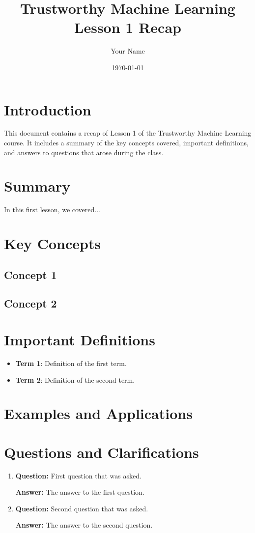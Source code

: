\documentclass[11pt,a4paper]{article}
\title{Trustworthy Machine Learning\\
\large Lesson 1 Recap}
\author{Your Name}
\date{\today}
\newcommand{\concept}[1]{\textbf{#1}}
\begin{document}
\maketitle
\tableofcontents
\newpage

\section{Introduction}
This document contains a recap of Lesson 1 of the Trustworthy Machine Learning course. It includes a summary of the key concepts covered, important definitions, and answers to questions that arose during the class.

\section{Summary}
In this first lesson, we covered...

\section{Key Concepts}
\subsection{Concept 1}

\subsection{Concept 2}

\section{Important Definitions}
\begin{itemize}
    \item \concept{Term 1}: Definition of the first term.
    \item \concept{Term 2}: Definition of the second term.
\end{itemize}

\section{Examples and Applications}

\section{Questions and Clarifications}
\begin{enumerate}
    \item \textbf{Question:} First question that was asked.
    
    \textbf{Answer:} The answer to the first question.
    
    \item \textbf{Question:} Second question that was asked.
    
    \textbf{Answer:} The answer to the second question.
\end{enumerate}
\end{document}
